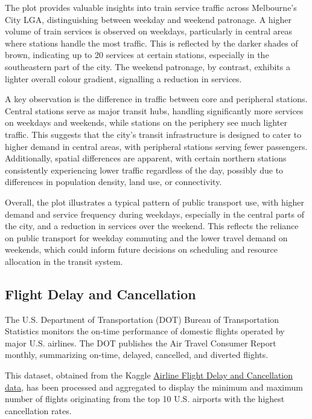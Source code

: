 The plot provides valuable insights into train service traffic across Melbourne's City LGA, distinguishing between weekday and weekend patronage. A higher volume of train services is observed on weekdays, particularly in central areas where stations handle the most traffic. This is reflected by the darker shades of brown, indicating up to 20 services at certain stations, especially in the southeastern part of the city. The weekend patronage, by contrast, exhibits a lighter overall colour gradient, signalling a reduction in services.

A key observation is the difference in traffic between core and peripheral stations. Central stations serve as major transit hubs, handling significantly more services on weekdays and weekends, while stations on the periphery see much lighter traffic. This suggests that the city's transit infrastructure is designed to cater to higher demand in central areas, with peripheral stations serving fewer passengers. Additionally, spatial differences are apparent, with certain northern stations consistently experiencing lower traffic regardless of the day, possibly due to differences in population density, land use, or connectivity.

Overall, the plot illustrates a typical pattern of public transport use, with higher demand and service frequency during weekdays, especially in the central parts of the city, and a reduction in services over the weekend. This reflects the reliance on public transport for weekday commuting and the lower travel demand on weekends, which could inform future decisions on scheduling and resource allocation in the transit system.

\hypertarget{flight-delay-and-cancellation}{%
\subsection{Flight Delay and Cancellation}\label{flight-delay-and-cancellation}}

The U.S. Department of Transportation (DOT) Bureau of Transportation Statistics monitors the on-time performance of domestic flights operated by major U.S. airlines. The DOT publishes the Air Travel Consumer Report monthly, summarizing on-time, delayed, cancelled, and diverted flights.

This dataset, obtained from the Kaggle \href{https://www.kaggle.com/datasets/patrickzel/flight-delay-and-cancellation-dataset-2019-2023}{Airline Flight Delay and Cancellation data}, has been processed and aggregated to display the minimum and maximum number of flights originating from the top 10 U.S. airports with the highest cancellation rates.

